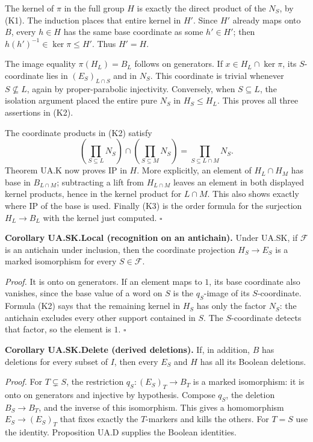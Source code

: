 The kernel of \(\pi\) in the full group \(H\) is exactly the direct
product of the \(N_S\), by (K1). The induction places that entire kernel
in \(H'\). Since \(H'\) already maps onto \(B\), every \(h\in H\) has
the same base coordinate as some \(h'\in H'\); then
\(h(h')^{-1}\in\ker\pi\leq H'\). Thus \(H'=H\).

The image equality \(\pi(H_L)=B_L\) follows on generators. If
\(x\in H_L\cap\ker\pi\), its \(S\)-coordinate lies in
\((E_S)_{L\cap S}\) and in \(N_S\). This coordinate is trivial whenever
\(S\not\subseteq L\), again by proper-parabolic injectivity. Conversely,
when \(S\subseteq L\), the isolation argument placed the entire pure
\(N_S\) in \(H_S\leq H_L\). This proves all three assertions in (K2).

The coordinate products in (K2) satisfy \[
\left(\prod_{S\subseteq L}N_S\right)\cap
\left(\prod_{S\subseteq M}N_S\right)
=\prod_{S\subseteq L\cap M}N_S.
\] Theorem UA.K now proves IP in \(H\). More explicitly, an element of
\(H_L\cap H_M\) has base in \(B_{L\cap M}\); subtracting a lift from
\(H_{L\cap M}\) leaves an element in both displayed kernel products,
hence in the kernel product for \(L\cap M\). This also shows exactly
where IP of the base is used. Finally (K3) is the order formula for the
surjection \(H_L\to B_L\) with the kernel just computed. \(\square\)

\textbf{Corollary UA.SK.Local (recognition on an antichain).} Under
UA.SK, if \(\mathcal F\) is an antichain under inclusion, then the
coordinate projection \(H_S\to E_S\) is a marked isomorphism for every
\(S\in\mathcal F\).

\emph{Proof.} It is onto on generators. If an element maps to \(1\), its
base coordinate also vanishes, since the base value of a word on \(S\)
is the \(q_S\)-image of its \(S\)-coordinate. Formula (K2) says that the
remaining kernel in \(H_S\) has only the factor \(N_S\): the antichain
excludes every other support contained in \(S\). The \(S\)-coordinate
detects that factor, so the element is \(1\). \(\square\)

\textbf{Corollary UA.SK.Delete (derived deletions).} If, in addition,
\(B\) has deletions for every subset of \(I\), then every \(E_S\) and
\(H\) has all its Boolean deletions.

\emph{Proof.} For \(T\subsetneq S\), the restriction
\(q_S:(E_S)_T\to B_T\) is a marked isomorphism: it is onto on generators
and injective by hypothesis. Compose \(q_S\), the deletion
\(B_S\to B_T\), and the inverse of this isomorphism. This gives a
homomorphism \(E_S\to(E_S)_T\) that fixes exactly the \(T\)-markers and
kills the others. For \(T=S\) use the identity. Proposition UA.D
supplies the Boolean identities.

